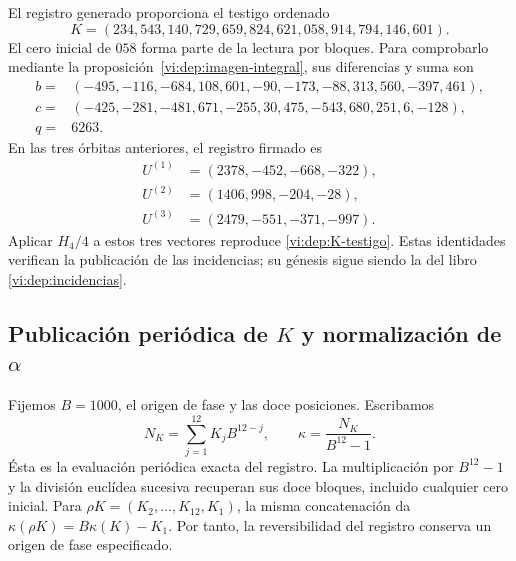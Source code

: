 El registro generado proporciona el testigo ordenado
\begin{equation}
 K=(234,543,140,729,659,824,621,058,914,794,146,601).
 \label{vi:dep:K-testigo}
\end{equation}
El cero inicial de \(058\) forma parte de la lectura por bloques.
Para comprobarlo mediante la proposición~\ref{vi:dep:imagen-integral}, sus diferencias
y suma son
\[
\begin{split}
b={}&(-495,-116,-684,108,601,-90,-173,-88,313,560,-397,461),\\
c={}&(-425,-281,-481,671,-255,30,475,-543,680,251,6,-128),\\
q={}&6263.
\end{split}
\]
En las tres órbitas anteriores, el registro firmado es
\[
 \begin{aligned}
 U^{(1)}&=(2378,-452,-668,-322),\\
 U^{(2)}&=(1406,998,-204,-28),\\
 U^{(3)}&=(2479,-551,-371,-997).
 \end{aligned}
\]
Aplicar \(H_4/4\) a estos tres vectores reproduce
\eqref{vi:dep:K-testigo}. Estas identidades verifican la publicación de
las incidencias; su génesis sigue siendo la del libro
\eqref{vi:dep:incidencias}.

\subsection{\texorpdfstring{Publicación periódica de \(K\) y normalización de \(\alpha\)}{Publicación periódica de K y normalización de alfa}}
\label{vi:dep:alpha}

Fijemos \(B=1000\), el origen de fase y las doce posiciones. Escribamos
\[
 N_K=\sum_{j=1}^{12}K_jB^{12-j},\qquad
 \kappa=\frac{N_K}{B^{12}-1}.
\]
Ésta es la evaluación periódica exacta del registro. La multiplicación
por \(B^{12}-1\) y la división euclídea sucesiva recuperan sus doce
bloques, incluido cualquier cero inicial. Para
\(\rho K=(K_2,\ldots,K_{12},K_1)\), la misma concatenación da
\(\kappa(\rho K)=B\kappa(K)-K_1\). Por tanto, la reversibilidad
del registro conserva un origen de fase especificado.

